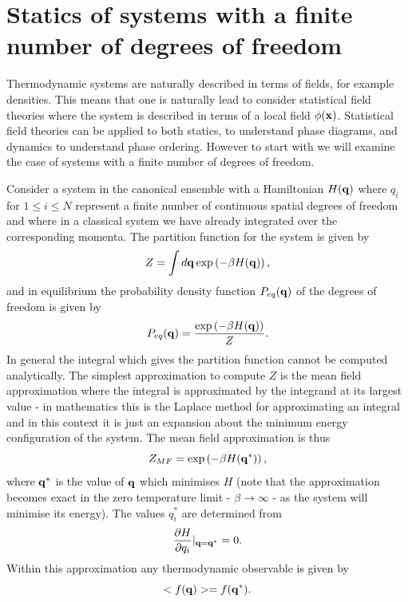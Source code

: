     \section{Statics of systems with a finite number of degrees of freedom}

Thermodynamic systems are naturally described in terms of fields, for example densities. This means that one is naturally lead to consider statistical field theories where the system is described in terms of a local field $\phi({\bf x})$. Statistical field theories can be applied to both statics, to understand phase diagrams, and dynamics to understand phase ordering. However to start with we will examine the case of systems with a finite number of degrees of freedom. 

Consider a system in the canonical ensemble with a Hamiltonian $H({\bf q})$ where $q_i$ for 
$1\leq i\leq N$ represent a finite number of continuous spatial degrees of freedom and where in a classical system we have already integrated over the corresponding momenta. The partition function for the system is given by
\begin{equation}
    Z = \int d{\bf q} \exp\left(-\beta H({\bf q})\right),
\end{equation}
and in equilibrium the probability density function $P_{eq}({\bf q})$ of the degrees of freedom is given by 
\begin{equation}
    P_{eq}({\bf q}) = \frac{\exp\left(-\beta H({\bf q})\right)}{Z}.\label{eqdis}
\end{equation}
In general the integral which gives the  partition function cannot be computed analytically.
The simplest approximation to compute $Z$ is the mean field approximation where the integral 
is approximated by the integrand at its largest value - in mathematics this is the Laplace method for approximating an integral and in this context it is just an expansion about the minimum energy configuration of the system. The mean field approximation is thus
\begin{equation}
    Z_{MF}= \exp\left(-\beta H({\bf q}^*)\right),
\end{equation}
where ${\bf q}^*$ is the value of ${\bf q}$ which minimises $H$ (note that the approximation becomes exact in the zero temperature limit - $\beta \to \infty$   - as the system will minimise its energy). The values $q_i^*$ are determined from
\begin{equation}
    \frac{\partial H}{\partial q_i}|_{{\bf q}={\bf q^*}}=0.
\end{equation}
Within this approximation any thermodynamic observable is given by
\begin{equation}
    < f({\bf q}) > = f({\bf q}^*).
\end{equation}

